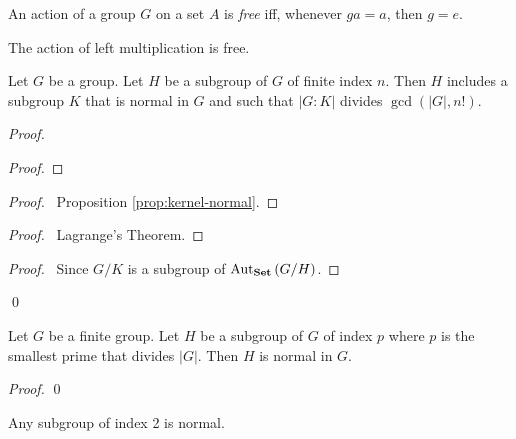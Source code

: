 \begin{df}[Free]
An action of a group $G$ on a set $A$ is \emph{free} iff, whenever $ga = a$, then $g = e$.
\end{df}

\begin{ex}
The action of left multiplication is free.
\end{ex}

\begin{prop}
Let $G$ be a group. Let $H$ be a subgroup of $G$ of finite index $n$. Then $H$ includes a subgroup $K$ that is normal in $G$ and such that $|G:K|$ divides $\gcd(|G|,n!)$.
\end{prop}

\begin{proof}
\pf
{}
\begin{proof}
\end{proof}
\begin{proof}
	\pf\ Proposition \ref{prop:kernel-normal}.
\end{proof}
\begin{proof}
	\pf\ Lagrange's Theorem.
\end{proof}
\begin{proof}
	\pf\ Since $G / K$ is a subgroup of $\mathrm{Aut}_{\mathbf{Set}} \left( {G/H} \right)$.
\end{proof}
\qed
\end{proof}

\begin{cor}
Let $G$ be a finite group. Let $H$ be a subgroup of $G$ of index $p$ where $p$ is the smallest prime that divides $|G|$. Then $H$ is normal in $G$.
\end{cor}

\begin{proof}
\pf
{}
\qed
\end{proof}

\begin{cor}
\label{cor:index-two-normal}
Any subgroup of index 2 is normal.
\end{cor}

